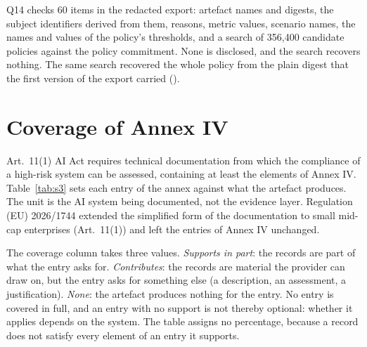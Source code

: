 \documentclass[a4paper,10pt]{article}
\begin{document}
\noindent Q14 checks 60 items in the redacted export: artefact names and digests, the subject identifiers derived from them, reasons, metric values, scenario names, the names and values of the policy's thresholds, and a search of 356,400 candidate policies against the policy commitment. None is disclosed, and the search recovers nothing. The same search recovered the whole policy from the plain digest that the first version of the export carried ().

\section{Coverage of Annex IV}
\label{sec:s3}

Art.~11(1) AI Act requires technical documentation from which the compliance of a high-risk system can be assessed, containing at least the elements of Annex IV. Table~\ref{tab:s3} sets each entry of the annex against what the artefact produces. The unit is the AI system being documented, not the evidence layer. Regulation (EU) 2026/1744 extended the simplified form of the documentation to small mid-cap enterprises (Art.~11(1)) and left the entries of Annex IV unchanged.

The coverage column takes three values. \emph{Supports in part}: the records are part of what the entry asks for. \emph{Contributes}: the records are material the provider can draw on, but the entry asks for something else (a description, an assessment, a justification). \emph{None}: the artefact produces nothing for the entry. No entry is covered in full, and an entry with no support is not thereby optional: whether it applies depends on the system. The table assigns no percentage, because a record does not satisfy every element of an entry it supports.
\end{document}
